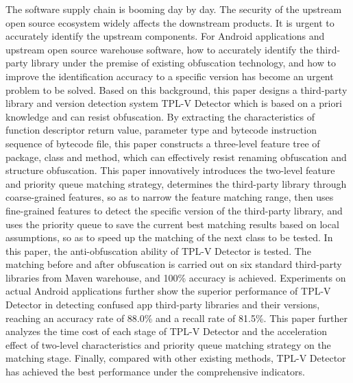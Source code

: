 \begin{abstract*}
The software supply chain is booming day by day. The security of the upstream open source ecosystem widely affects the downstream products. It is urgent to accurately identify the upstream components. For Android applications and upstream open source warehouse software, how to accurately identify the third-party library under the premise of existing obfuscation technology, and how to improve the identification accuracy to a specific version has become an urgent problem to be solved. Based on this background, this paper designs a third-party library and version detection system TPL-V Detector which is based on a priori knowledge and can resist obfuscation. By extracting the characteristics of function descriptor return value, parameter type and bytecode instruction sequence of bytecode file, this paper constructs a three-level feature tree of package, class and method, which can effectively resist renaming obfuscation and structure obfuscation. This paper innovatively introduces the two-level feature and priority queue matching strategy, determines the third-party library through coarse-grained features, so as to narrow the feature matching range, then uses fine-grained features to detect the specific version of the third-party library, and uses the priority queue to save the current best matching results based on local assumptions, so as to speed up the matching of the next class to be tested. In this paper, the anti-obfuscation ability of TPL-V Detector is tested. The matching before and after obfuscation is carried out on six standard third-party libraries from Maven warehouse, and 100\% accuracy is achieved. Experiments on actual Android applications further show the superior performance of TPL-V Detector in detecting confused app third-party libraries and their versions, reaching an accuracy rate of 88.0\% and a recall rate of 81.5\%. This paper further analyzes the time cost of each stage of TPL-V Detector and the acceleration effect of two-level characteristics and priority queue matching strategy on the matching stage. Finally, compared with other existing methods, TPL-V Detector has achieved the best performance under the comprehensive indicators.
\end{abstract*}
